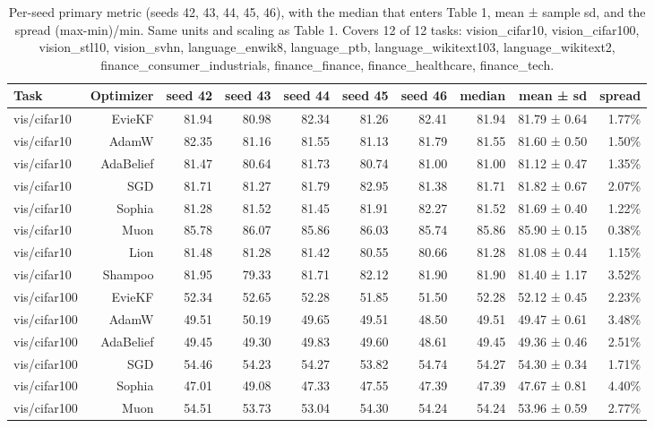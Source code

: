 \begin{table}[t]
\centering
\small
\caption{Per-seed primary metric (seeds 42, 43, 44, 45, 46), with the median that enters Table 1, mean ± sample sd, and the spread (max-min)/min. Same units and scaling as Table 1. Covers 12 of 12 tasks: vision\_cifar10, vision\_cifar100, vision\_stl10, vision\_svhn, language\_enwik8, language\_ptb, language\_wikitext103, language\_wikitext2, finance\_consumer\_industrials, finance\_finance, finance\_healthcare, finance\_tech.}
\label{tab:table3_seed_robustness}
\begin{tabular}{lrrrrrrrrr}
\toprule
Task & Optimizer & seed 42 & seed 43 & seed 44 & seed 45 & seed 46 & median & mean ± sd & spread \\
\midrule
vis/cifar10 & EvieKF & 81.94 & 80.98 & 82.34 & 81.26 & 82.41 & 81.94 & 81.79 ± 0.64 & 1.77\% \\
vis/cifar10 & AdamW & 82.35 & 81.16 & 81.55 & 81.13 & 81.79 & 81.55 & 81.60 ± 0.50 & 1.50\% \\
vis/cifar10 & AdaBelief & 81.47 & 80.64 & 81.73 & 80.74 & 81.00 & 81.00 & 81.12 ± 0.47 & 1.35\% \\
vis/cifar10 & SGD & 81.71 & 81.27 & 81.79 & 82.95 & 81.38 & 81.71 & 81.82 ± 0.67 & 2.07\% \\
vis/cifar10 & Sophia & 81.28 & 81.52 & 81.45 & 81.91 & 82.27 & 81.52 & 81.69 ± 0.40 & 1.22\% \\
vis/cifar10 & Muon & 85.78 & 86.07 & 85.86 & 86.03 & 85.74 & 85.86 & 85.90 ± 0.15 & 0.38\% \\
vis/cifar10 & Lion & 81.48 & 81.28 & 81.42 & 80.55 & 80.66 & 81.28 & 81.08 ± 0.44 & 1.15\% \\
vis/cifar10 & Shampoo & 81.95 & 79.33 & 81.71 & 82.12 & 81.90 & 81.90 & 81.40 ± 1.17 & 3.52\% \\
vis/cifar100 & EvieKF & 52.34 & 52.65 & 52.28 & 51.85 & 51.50 & 52.28 & 52.12 ± 0.45 & 2.23\% \\
vis/cifar100 & AdamW & 49.51 & 50.19 & 49.65 & 49.51 & 48.50 & 49.51 & 49.47 ± 0.61 & 3.48\% \\
vis/cifar100 & AdaBelief & 49.45 & 49.30 & 49.83 & 49.60 & 48.61 & 49.45 & 49.36 ± 0.46 & 2.51\% \\
vis/cifar100 & SGD & 54.46 & 54.23 & 54.27 & 53.82 & 54.74 & 54.27 & 54.30 ± 0.34 & 1.71\% \\
vis/cifar100 & Sophia & 47.01 & 49.08 & 47.33 & 47.55 & 47.39 & 47.39 & 47.67 ± 0.81 & 4.40\% \\
vis/cifar100 & Muon & 54.51 & 53.73 & 53.04 & 54.30 & 54.24 & 54.24 & 53.96 ± 0.59 & 2.77\% \\

\end{tabular}
\end{table}
